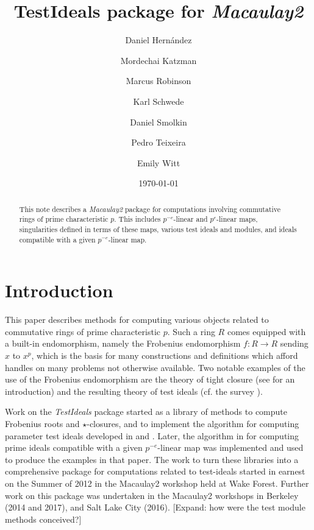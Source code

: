 \documentclass[11pt]{amsart}
\begin{document}
\title{{TestIdeals} package for \emph{Macaulay2}}
\author{Daniel Hern\'andez}
\author{Mordechai Katzman}
\author{Marcus Robinson}
\author{Karl Schwede}
\author{Daniel Smolkin}
\author{Pedro Teixeira}
\author{Emily Witt}
\date{\today}
\address{Department of Mathematics, University of Utah, 155 S 1400 E Room 233, Salt Lake City, UT, 84112}

\begin{abstract}
  This note describes a \emph{Macaulay2} package for computations involving commutative rings of prime characteristic $p$.
  This includes $p^{-e}$-linear and $p^{e}$-linear  maps,
  singularities defined in terms of these maps,  various test ideals and modules, and ideals compatible with a given $p^{-e}$-linear map.
\end{abstract}




\maketitle

\section{Introduction}

This paper describes methods for computing various objects related to commutative rings of prime characteristic $p$.
Such a ring $R$ comes equipped with a built-in endomorphism, namely the Frobenius endomorphism $f:R \rightarrow R$ sending $x$ to $x^p$, which is the basis for many constructions and definitions
which afford handles on many problems not otherwise available. Two notable examples of the use of the Frobenius endomorphism are the theory of tight closure
(see \cite{HochsterHunekeTC1} for an introduction)
and the resulting theory of test ideals
(cf. the survey \cite{SchwedeTuckerTestIdealSurvey}).

Work on the \emph{TestIdeals} package started as a library of methods to compute  Frobenius roots  and $\star$-closures, and to implement the algorithm for computing parameter test ideals
developed in \cite{KatzmanParameterTestIdealOfCMRings} and \cite{KatzmanFrobeniusMapsOnInjectiveHulls}.
Later, the algorithm in  \cite{KatzmanSchwedeAlgorithm} for computing prime ideals compatible with a given $p^{-e}$-linear map was implemented and
used to produce the examples in that paper. The work to turn these libraries into a comprehensive package for computations related to test-ideals
started in earnest on the Summer of 2012 in the Macaulay2 workshop held at Wake Forest. Further work on this package was undertaken in the Macaulay2 workshops in
Berkeley (2014 and 2017), and Salt Lake City (2016).
{\hfill\large\color{red} [Expand: how were the test module methods conceived?]}\\
\end{document}
